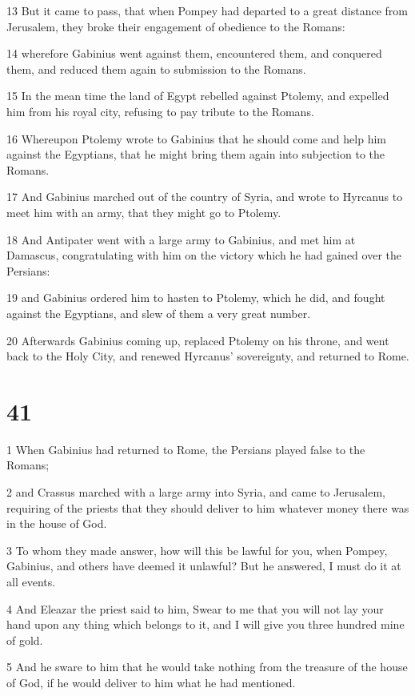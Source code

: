 13 But it came to pass, that when Pompey had departed to a great distance from Jerusalem, they broke their engagement of obedience to the Romans: 

14 wherefore Gabinius went against them, encountered them, and conquered them, and reduced them again to submission to the Romans. 

15 In the mean time the land of Egypt rebelled against Ptolemy, and expelled him from his royal city, refusing to pay tribute to the Romans. 

16 Whereupon Ptolemy wrote to Gabinius that he should come and help him against the Egyptians, that he might bring them again into subjection to the Romans. 

17 And Gabinius marched out of the country of Syria, and wrote to Hyrcanus to meet him with an army, that they might go to Ptolemy. 

18 And Antipater went with a large army to Gabinius, and met him at Damascus, congratulating with him on the victory which he had gained over the Persians: 

19 and Gabinius ordered him to hasten to Ptolemy, which he did, and fought against the Egyptians, and slew of them a very great number. 

20 Afterwards Gabinius coming up, replaced Ptolemy on his throne, and went back to the Holy City, and renewed Hyrcanus’ sovereignty, and returned to Rome. 


\chapter{41}

\par {}

1 When Gabinius had returned to Rome, the Persians played false to the Romans; 

2 and Crassus marched with a large army into Syria, and came to Jerusalem, requiring of the priests that they should deliver to him whatever money there was in the house of God. 

3 To whom they made answer, how will this be lawful for you, when Pompey, Gabinius, and others have deemed it unlawful? But he answered, I must do it at all events. 

4 And Eleazar the priest said to him, Swear to me that you will not lay your hand upon any thing which belongs to it, and I will give you three hundred mine of gold. 

5 And he sware to him that he would take nothing from the treasure of the house of God, if he would deliver to him what he had mentioned. 

